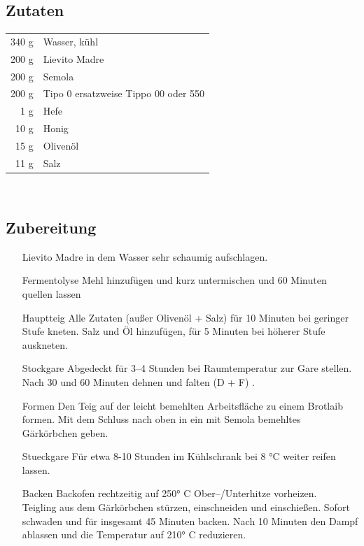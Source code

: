 \subsection*{Zutaten}
\begin{tabular}{r l}
    340 g & Wasser, kühl                         \\
    200 g & Lievito Madre                        \\
    200 g & Semola                               \\
    200 g & Tipo 0 ersatzweise Tippo 00 oder 550 \\
      1 g & Hefe                                 \\
     10 g & Honig                                \\
     15 g & Olivenöl                             \\
     11 g & Salz
\end{tabular}\\

\subsection*{Zubereitung}
\begin{enumerate}
    \item [Lievito Madre] in dem Wasser sehr schaumig aufschlagen.
    \item [\Gls{Fermentolyse}] Mehl hinzufügen und kurz untermischen und 60 Minuten quellen lassen
    \item [\Gls{Hauptteig}]  Alle Zutaten (außer Olivenöl + Salz) für 10 Minuten bei geringer Stufe kneten. Salz und Öl hinzufügen, für 5 Minuten bei höherer Stufe auskneten.
    \item [\Gls{Stockgare}] Abgedeckt für 3–4 Stunden bei Raumtemperatur zur Gare stellen. Nach 30 und 60 Minuten dehnen und falten (D + F) . 
    \item [\Gls{Formen}] Den Teig auf der leicht bemehlten Arbeitsfläche zu einem Brotlaib formen. Mit dem Schluss nach oben in ein mit Semola bemehltes Gärkörbchen geben.
    \item [\Gls{Stueckgare}]  Für etwa 8-10 Stunden im Kühlschrank bei 8 °C weiter reifen lassen.
    \item [\Gls{Backen}] Backofen rechtzeitig auf 250° C Ober–/Unterhitze vorheizen.\\
    Teigling aus dem Gärkörbchen stürzen, einschneiden  und einschießen. Sofort schwaden und für insgesamt 45
    Minuten backen. Nach 10 Minuten den Dampf ablassen und die Temperatur auf 210° C reduzieren.
\end{enumerate}
                                                                            

